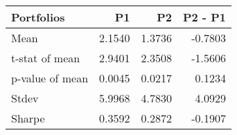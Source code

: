 \begin{tabular}{lrrr}
\toprule
Portfolios & P1 & P2 & P2 - P1 \\
\midrule
Mean & 2.1540 & 1.3736 & -0.7803 \\
t-stat of mean & 2.9401 & 2.3508 & -1.5606 \\
p-value of mean & 0.0045 & 0.0217 & 0.1234 \\
Stdev & 5.9968 & 4.7830 & 4.0929 \\
Sharpe & 0.3592 & 0.2872 & -0.1907 \\
\bottomrule
\end{tabular}
